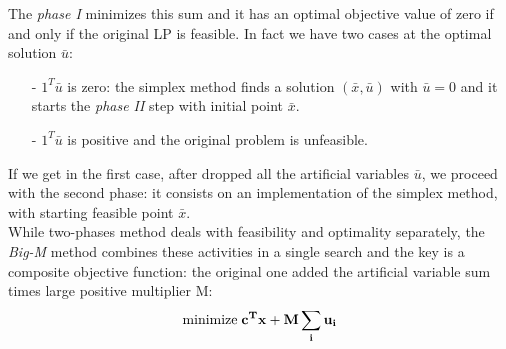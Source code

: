 \documentclass[a4paper,10 pt,titlepage,twoside]{book}
\theoremstyle{plain}
\theoremstyle{definition}
\theoremstyle{remark}
\begin{document}
The \textit{phase I} minimizes this sum and it has an optimal objective value of zero if and only if the original LP is feasible. In fact we have two cases at the optimal solution $\bar{u}$: 
\begin{itemize}
	\item[-]$1^{T}\bar{u}$ is zero: the simplex method finds a solution $(\bar{x},\bar{u})$ with $\bar{u}=0$ and it starts the \textit{phase II} step with initial point $\bar{x}$.
	\item[-]$1^{T}\bar{u}$ is positive and the original problem is unfeasible.
\end{itemize}
If we get in the first case, after dropped all the artificial variables $\bar{u}$, we proceed with the second phase: it consists on an implementation of the simplex method, with starting feasible point $\bar{x}$.\\ 
While two-phases method deals with feasibility and optimality separately, the \textit{Big-M} method combines these activities in a single search and the key is a composite objective function: the original one added the artificial variable sum times  large positive multiplier M:\\
\begin{equation}
\text{minimize\;}\mathbf{c^{T}x+M \sum_{i}{u}_{i}}\\
\end{equation}  
\end{document}
